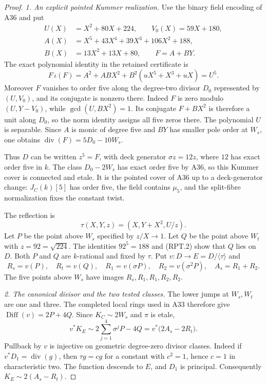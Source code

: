 \begin{proof}
\emph{1. An explicit pointed Kummer realization.}
Use the binary field encoding of A36 and put
\[
 \begin{aligned}
 U(X)&=X^2+80X+224,\qquad V_0(X)=59X+180,\\
 A(X)&=X^5+43X^4+39X^3+106X^2+188,\\
 B(X)&=13X^2+13X+80,\qquad F=A+BY.
 \end{aligned}
 \tag{RPT.1}
\]
The exact polynomial identity in the retained certificate is
\[
 F\,\iota(F)=A^2+ABX^2+B^2(uX^5+X^3+uX)=U^5.
 \tag{RPT.2}
\]
Moreover $F$ vanishes to order five along the degree-two divisor
$D_0$ represented by $(U,V_0)$, and its conjugate is nonzero
there. Indeed $F$ is zero modulo $(U,Y-V_0)$, while
$\gcd(U,BX^2)=1$. Its conjugate $F+BX^2$ is therefore a
unit along $D_0$, so the norm identity assigns all five zeros
there. The polynomial $U$ is separable.
Since $A$ is monic of degree five and $BY$ has smaller pole order
at $W_s$, one obtains
$\operatorname{div}(F)=5D_0-10W_s$.

Thus $D$ can be written $z^5=F$, with deck generator
$\sigma z=12z$, where $12$ has exact order five in $k$.
The class $D_0-2W_s$ has exact order five by A36, so this
Kummer cover is connected and etale. It is the pointed cover
of A36 up to a deck-generator change: $J_C(k)[5]$ has order
five, the field contains $\mu_5$, and the split-fibre
normalization fixes the constant twist.

The reflection is
\[
 \tau(X,Y,z)=(X,Y+X^2,U/z).
 \tag{RPT.3}
\]
Let $P$ be the point above $W_s$ specified by $z/X\to1$.
Let $Q$ be the point above $W_t$ with $z=92=\sqrt{224}$.
The identities $92^5=188$ and (RPT.2) show that $Q$ lies on
$D$. Both $P$ and $Q$ are $k$-rational and fixed by $\tau$.
Put $v:D\to E=D/\langle\tau\rangle$ and
\[
 R_s=v(P),\quad R_t=v(Q),\quad
 R_1=v(\sigma P),\quad R_2=v(\sigma^2P),\quad A_s=R_1+R_2.
 \tag{RPT.4}
\]
The five points above $W_s$ have images $R_s,R_1,R_1,R_2,R_2$.

\emph{2. The canonical divisor and the two tested classes.}
The lower jumps at $W_s,W_t$ are one and three. The completed
local rings used in A33 therefore give
$\operatorname{Diff}(v)=2P+4Q$.
Since $K_C\sim2W_s$ and $\pi$ is etale,
\[
             v^*K_E\sim2\sum_{j=1}^4\sigma^jP-4Q
                         =v^*\bigl(2A_s-2R_t\bigr).
 \tag{RPT.5}
\]
Pullback by $v$ is injective on geometric degree-zero divisor
classes. Indeed if $v^*D_1=\operatorname{div}(g)$, then
$\tau g=cg$ for a constant with $c^2=1$, hence $c=1$ in
characteristic two. The function descends to $E$, and $D_1$
is principal. Consequently $K_E\sim2(A_s-R_t)$.


\end{proof}
